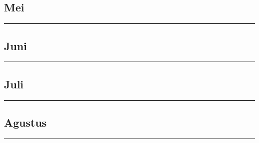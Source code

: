 \documentclass[
]{book}
\begin{document}
\hypertarget{mei}{%
\subsection{Mei}\label{mei}}

\begin{center}\rule{0.5\linewidth}{0.5pt}\end{center}

\hypertarget{juni}{%
\subsection{Juni}\label{juni}}

\begin{center}\rule{0.5\linewidth}{0.5pt}\end{center}

\hypertarget{juli}{%
\subsection{Juli}\label{juli}}

\begin{center}\rule{0.5\linewidth}{0.5pt}\end{center}

\hypertarget{agustus}{%
\subsection{Agustus}\label{agustus}}

\begin{center}\rule{0.5\linewidth}{0.5pt}\end{center}

  
\end{document}
